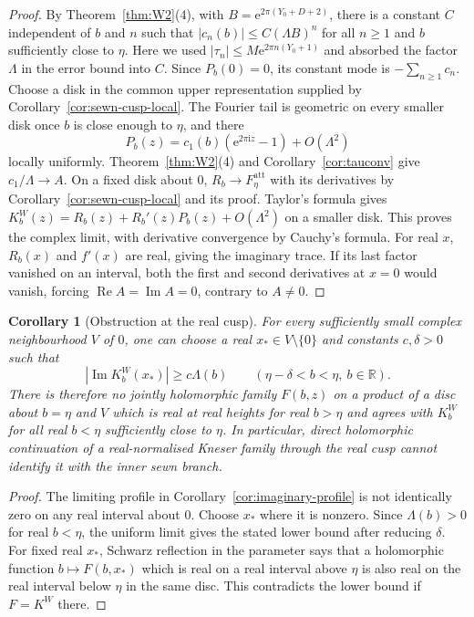 \documentclass[11pt,a4paper]{article}
\newtheorem{corollary}[theorem]{Corollary}
\theoremstyle{definition}
\newcommand{\Rr}{R}
\newcommand{\Kk}{K}
\newcommand{\eee}{\mathrm{e}}
\newcommand{\ii}{\mathrm{i}}
\begin{document}
\begin{proof}
By Theorem~\ref{thm:W2}(4), with
$B=\eee^{2\pi(Y_0+D+2)}$, there is a constant $C$ independent of $b$ and
$n$ such that $|c_n(b)|\le C(\Lambda B)^n$ for all $n\ge1$ and $b$ sufficiently
close to $\eta$.  Here we used $|\tau_n|\le M\eee^{2\pi n(Y_0+1)}$ and
absorbed the factor $\Lambda$ in the error bound into $C$.
Since $P_b(0)=0$, its constant mode is $-\sum_{n\ge1}c_n$.
Choose a disk in the common upper representation supplied by
Corollary~\ref{cor:sewn-cusp-local}.  The Fourier tail is geometric
on every smaller disk once $b$ is close enough to $\eta$, and there
\[
 P_b(z)=c_1(b)(\eee^{2\pi\ii z}-1)+O(\Lambda^2)
\]
locally uniformly.  Theorem~\ref{thm:W2}(4) and
Corollary~\ref{cor:tauconv} give $c_1/\Lambda\to A$.
On a fixed disk about $0$, $\Rr_b\to F_\eta^{\mathrm{att}}$ with its
derivatives by Corollary~\ref{cor:sewn-cusp-local} and its proof.
Taylor's formula gives
$\Kk_b^W(z)=\Rr_b(z)+\Rr_b'(z)P_b(z)+O(\Lambda^2)$
on a smaller disk.  This proves the complex limit, with derivative
convergence by Cauchy's formula.  For real $x$, $\Rr_b(x)$ and $f'(x)$
are real, giving the imaginary trace.
If its last factor vanished on an interval, both the first and second
derivatives at $x=0$ would vanish, forcing $\operatorname{Re}A=
\operatorname{Im}A=0$, contrary to $A\ne0$.
\end{proof}

\begin{corollary}[Obstruction at the real cusp]
\label{cor:cusp-real-obstruction}
For every sufficiently small complex neighbourhood $V$ of $0$, one can
choose a real $x_*\in V\setminus\{0\}$ and constants $c,\delta>0$ such that
\[
 |\operatorname{Im}\Kk_b^W(x_*)|\ge c\Lambda(b)
 \qquad(\eta-\delta<b<\eta,\ b\in\mathbb R).
\]
There is therefore no jointly holomorphic family $F(b,z)$ on a product
of a disc about $b=\eta$ and $V$ which is real at real heights for real
$b>\eta$ and agrees with $\Kk_b^W$ for all real $b<\eta$ sufficiently
close to $\eta$.  In particular, direct holomorphic continuation of a
real-normalised Kneser family through the real cusp cannot identify it
with the inner sewn branch.
\end{corollary}

\begin{proof}
The limiting profile in Corollary~\ref{cor:imaginary-profile} is not
identically zero on any real interval about $0$.  Choose $x_*$ where it
is nonzero.  Since $\Lambda(b)>0$ for real $b<\eta$, the uniform limit
gives the stated lower bound after reducing $\delta$.
For fixed real $x_*$, Schwarz reflection in the parameter says that a
holomorphic function $b\mapsto F(b,x_*)$ which is real on a real interval
above $\eta$ is also real on the real interval below $\eta$ in the same
disc.  This contradicts the lower bound if $F=\Kk^W$ there.
\end{proof}
\end{document}
